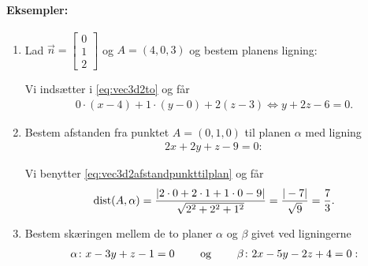\paragraph*{Eksempler:}
\begin{enumerate}
\item Lad $\vec{n}=\begin{bmatrix}0 \\ 1 \\ 2\end{bmatrix}$ og $A=(4,0,3)$ og bestem planens ligning:

Vi indsætter i \eqref{eq:vec3d2to} og får
\begin{align*}
0 \cdot (x - 4) + 1 \cdot (y-0)  + 2(z-3) \Leftrightarrow y + 2z - 6 = 0.
\end{align*}
\item Bestem afstanden fra punktet $A=(0,1,0)$ til planen $\alpha$ med ligning
\begin{align*}
2x+2y+z-9=0:
\end{align*}

Vi benytter \eqref{eq:vec3d2afstandpunkttilplan} og får 
\begin{align*}
\mathrm{dist}(A,\alpha)=\frac{\vert 2 \cdot 0 + 2 \cdot 1 + 1 \cdot 0 - 9\vert}{\sqrt{2^2+2^2+1^2}}=\frac{\vert -7\vert}{\sqrt{9}} = \frac{7}{3}.
\end{align*}
\item Bestem skæringen mellem de to planer $\alpha$ og $\beta$ givet ved ligningerne
\begin{align*}
\alpha \colon x-3y+z-1 = 0 \qquad \textup{ og } \qquad \beta \colon 2x-5y-2z+4 = 0:
\end{align*}


\end{enumerate}

